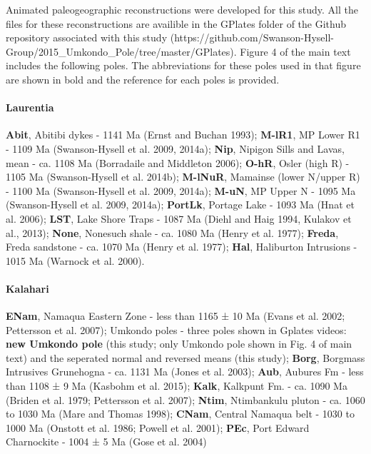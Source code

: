\documentclass{article}
\begin{document}
    Animated paleogeographic reconstructions were developed for this study.
All the files for these reconstructions are availible in the GPlates
folder of the Github repository associated with this study
(https://github.com/Swanson-Hysell-Group/2015\_Umkondo\_Pole/tree/master/GPlates).
Figure 4 of the main text includes the following poles. The
abbreviations for these poles used in that figure are shown in bold and
the reference for each poles is provided.

    \paragraph{Laurentia}\label{laurentia}

\textbf{Abit}, Abitibi dykes - 1141 Ma (Ernst and Buchan 1993);
\textbf{M-lR1}, MP Lower R1 - 1109 Ma (Swanson-Hysell et al. 2009,
2014a); \textbf{Nip}, Nipigon Sills and Lavas, mean - ca. 1108 Ma
(Borradaile and Middleton 2006); \textbf{O-hR}, Osler (high R) - 1105 Ma
(Swanson-Hysell et al. 2014b); \textbf{M-lNuR}, Mamainse (lower N/upper
R) - 1100 Ma (Swanson-Hysell et al. 2009, 2014a); \textbf{M-uN}, MP
Upper N - 1095 Ma (Swanson-Hysell et al. 2009, 2014a); \textbf{PortLk},
Portage Lake - 1093 Ma (Hnat et al. 2006); \textbf{LST}, Lake Shore
Traps - 1087 Ma (Diehl and Haig 1994, Kulakov et al., 2013);
\textbf{None}, Nonesuch shale - ca. 1080 Ma (Henry et al. 1977);
\textbf{Freda}, Freda sandstone - ca. 1070 Ma (Henry et al. 1977);
\textbf{Hal}, Haliburton Intrusions - 1015 Ma (Warnock et al. 2000).

\paragraph{Kalahari}\label{kalahari}

\textbf{ENam}, Namaqua Eastern Zone - less than 1165 ± 10 Ma (Evans et
al. 2002; Pettersson et al. 2007); Umkondo poles - three poles shown in
Gplates videos: \textbf{new Umkondo pole} (this study; only Umkondo pole
shown in Fig. 4 of main text) and the seperated normal and reversed
means (this study); \textbf{Borg}, Borgmass Intrusives Grunehogna - ca.
1131 Ma (Jones et al. 2003); \textbf{Aub}, Aubures Fm - less than 1108 ±
9 Ma (Kasbohm et al. 2015); \textbf{Kalk}, Kalkpunt Fm. - ca. 1090 Ma
(Briden et al. 1979; Pettersson et al. 2007); \textbf{Ntim}, Ntimbankulu
pluton - ca. 1060 to 1030 Ma (Mare and Thomas 1998); \textbf{CNam},
Central Namaqua belt - 1030 to 1000 Ma (Onstott et al. 1986; Powell et
al. 2001); \textbf{PEc}, Port Edward Charnockite - 1004 ± 5 Ma (Gose et
al. 2004)
\end{document}
